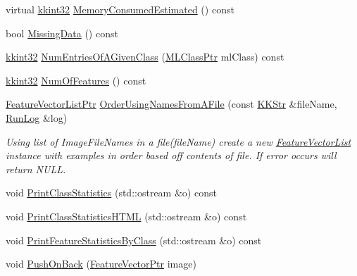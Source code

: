 \begin{DoxyCompactItemize}
virtual \hyperlink{namespace_k_k_b_a8fa4952cc84fda1de4bec1fbdd8d5b1b}{kkint32} \hyperlink{class_k_k_m_l_l_1_1_feature_vector_list_a5a61112467b437ab3ffa7e302caa17e9}{Memory\+Consumed\+Estimated} () const 
\item 
bool \hyperlink{class_k_k_m_l_l_1_1_feature_vector_list_a972581e9ef96871e1db9eaff45aa0b5e}{Missing\+Data} () const 
\item 
\hyperlink{namespace_k_k_b_a8fa4952cc84fda1de4bec1fbdd8d5b1b}{kkint32} \hyperlink{class_k_k_m_l_l_1_1_feature_vector_list_a3071b9921dd39c7933d666c6c0e18f9a}{Num\+Entries\+Of\+A\+Given\+Class} (\hyperlink{namespace_k_k_m_l_l_ac272393853d59e72e8456f14cd6d8c23}{M\+L\+Class\+Ptr} ml\+Class) const 
\item 
\hyperlink{namespace_k_k_b_a8fa4952cc84fda1de4bec1fbdd8d5b1b}{kkint32} \hyperlink{class_k_k_m_l_l_1_1_feature_vector_list_a9b14c44e69c63c7680547f0675ab3e7a}{Num\+Of\+Features} () const 
\item 
\hyperlink{class_k_k_m_l_l_1_1_feature_vector_list_af22f34b214e0dd3b16760002ce392355}{Feature\+Vector\+List\+Ptr} \hyperlink{class_k_k_m_l_l_1_1_feature_vector_list_a02576db671a72028f9eab4ed152138b8}{Order\+Using\+Names\+From\+A\+File} (const \hyperlink{class_k_k_b_1_1_k_k_str}{K\+K\+Str} \&file\+Name, \hyperlink{class_k_k_b_1_1_run_log}{Run\+Log} \&log)
\begin{DoxyCompactList}\small\item\em Using list of Image\+File\+Names in a file(\textquotesingle{}file\+Name\textquotesingle{}) create a new \hyperlink{class_k_k_m_l_l_1_1_feature_vector_list}{Feature\+Vector\+List} instance with examples in order based off contents of file. If error occurs will return N\+U\+LL. \end{DoxyCompactList}\item 
void \hyperlink{class_k_k_m_l_l_1_1_feature_vector_list_aaa80afcff045f6759b515539cb7ae73b}{Print\+Class\+Statistics} (std\+::ostream \&o) const 
\item 
void \hyperlink{class_k_k_m_l_l_1_1_feature_vector_list_a36cb090ed3ce8c729cb9c4b2c95e8c9f}{Print\+Class\+Statistics\+H\+T\+ML} (std\+::ostream \&o) const 
\item 
void \hyperlink{class_k_k_m_l_l_1_1_feature_vector_list_a64201f8f207aa2d76c547ecefd0ed935}{Print\+Feature\+Statistics\+By\+Class} (std\+::ostream \&o) const 
\item 
void \hyperlink{class_k_k_m_l_l_1_1_feature_vector_list_abd43779a90a6aa3db1de8092be877bdb}{Push\+On\+Back} (\hyperlink{namespace_k_k_m_l_l_a0c5df3d48f45926fbc4fee04f5e3bc04}{Feature\+Vector\+Ptr} image)

\end{DoxyCompactItemize}
